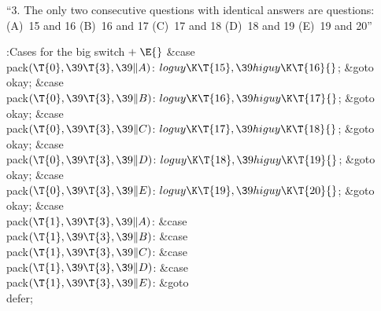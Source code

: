 ``3. The only two consecutive questions with identical
answers are questions:
(A)~15 and 16 (B)~16 and 17 (C)~17 and 18 (D)~18 and 19 (E)~19 and 20''

\Y\B\4:Cases for the big switch\X${}\mathrel+\E{}$\6
\4\&{case} \\{pack}${}(\T{0},\39\T{3},\39\|A){}$:\5
${}\\{loguy}\K\T{15},\39\\{higuy}\K\T{16}{}$;\5
\&{goto} \\{okay};\6
\4\&{case} \\{pack}${}(\T{0},\39\T{3},\39\|B){}$:\5
${}\\{loguy}\K\T{16},\39\\{higuy}\K\T{17}{}$;\5
\&{goto} \\{okay};\6
\4\&{case} \\{pack}${}(\T{0},\39\T{3},\39\|C){}$:\5
${}\\{loguy}\K\T{17},\39\\{higuy}\K\T{18}{}$;\5
\&{goto} \\{okay};\6
\4\&{case} \\{pack}${}(\T{0},\39\T{3},\39\|D){}$:\5
${}\\{loguy}\K\T{18},\39\\{higuy}\K\T{19}{}$;\5
\&{goto} \\{okay};\6
\4\&{case} \\{pack}${}(\T{0},\39\T{3},\39\|E){}$:\5
${}\\{loguy}\K\T{19},\39\\{higuy}\K\T{20}{}$;\5
\&{goto} \\{okay};\6
\4\&{case} \\{pack}${}(\T{1},\39\T{3},\39\|A){}$:\5
\&{case} \\{pack}${}(\T{1},\39\T{3},\39\|B){}$:\5
\&{case} \\{pack}${}(\T{1},\39\T{3},\39\|C){}$:\5
\&{case} \\{pack}${}(\T{1},\39\T{3},\39\|D){}$:\5
\&{case} \\{pack}${}(\T{1},\39\T{3},\39\|E){}$:\5
\&{goto} \\{defer};\par
\fi

